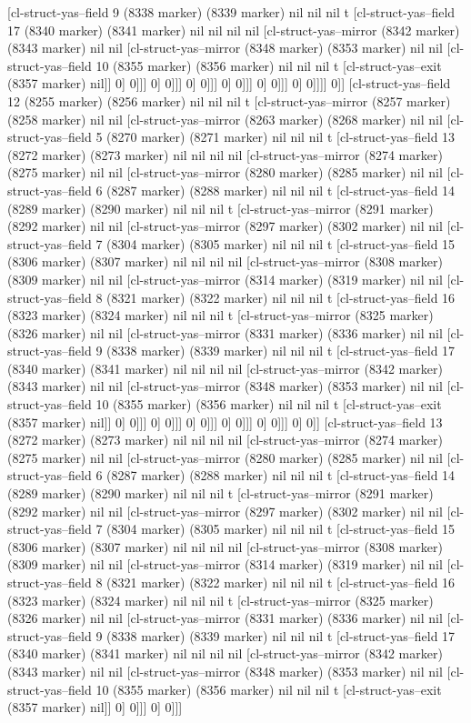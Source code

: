 {{[cl-struct-yas--field 9 (8338 marker) (8339 marker) nil nil nil t [cl-struct-yas--field 17 (8340 marker) (8341 marker) nil nil nil nil [cl-struct-yas--mirror (8342 marker) (8343 marker) nil nil [cl-struct-yas--mirror (8348 marker) (8353 marker) nil nil [cl-struct-yas--field 10 (8355 marker) (8356 marker) nil nil nil t [cl-struct-yas--exit (8357 marker) nil]] 0] 0]]] 0] 0]]] 0] 0]]] 0] 0]]] 0] 0]]] 0] 0]]]] 0]] [cl-struct-yas--field 12 (8255 marker) (8256 marker) nil nil nil t [cl-struct-yas--mirror (8257 marker) (8258 marker) nil nil [cl-struct-yas--mirror (8263 marker) (8268 marker) nil nil [cl-struct-yas--field 5 (8270 marker) (8271 marker) nil nil nil t [cl-struct-yas--field 13 (8272 marker) (8273 marker) nil nil nil nil [cl-struct-yas--mirror (8274 marker) (8275 marker) nil nil [cl-struct-yas--mirror (8280 marker) (8285 marker) nil nil [cl-struct-yas--field 6 (8287 marker) (8288 marker) nil nil nil t [cl-struct-yas--field 14 (8289 marker) (8290 marker) nil nil nil t [cl-struct-yas--mirror (8291 marker) (8292 marker) nil nil [cl-struct-yas--mirror (8297 marker) (8302 marker) nil nil [cl-struct-yas--field 7 (8304 marker) (8305 marker) nil nil nil t [cl-struct-yas--field 15 (8306 marker) (8307 marker) nil nil nil nil [cl-struct-yas--mirror (8308 marker) (8309 marker) nil nil [cl-struct-yas--mirror (8314 marker) (8319 marker) nil nil [cl-struct-yas--field 8 (8321 marker) (8322 marker) nil nil nil t [cl-struct-yas--field 16 (8323 marker) (8324 marker) nil nil nil t [cl-struct-yas--mirror (8325 marker) (8326 marker) nil nil [cl-struct-yas--mirror (8331 marker) (8336 marker) nil nil [cl-struct-yas--field 9 (8338 marker) (8339 marker) nil nil nil t [cl-struct-yas--field 17 (8340 marker) (8341 marker) nil nil nil nil [cl-struct-yas--mirror (8342 marker) (8343 marker) nil nil [cl-struct-yas--mirror (8348 marker) (8353 marker) nil nil [cl-struct-yas--field 10 (8355 marker) (8356 marker) nil nil nil t [cl-struct-yas--exit (8357 marker) nil]] 0] 0]]] 0] 0]]] 0] 0]]] 0] 0]]] 0] 0]]] 0] 0]] [cl-struct-yas--field 13 (8272 marker) (8273 marker) nil nil nil nil [cl-struct-yas--mirror (8274 marker) (8275 marker) nil nil [cl-struct-yas--mirror (8280 marker) (8285 marker) nil nil [cl-struct-yas--field 6 (8287 marker) (8288 marker) nil nil nil t [cl-struct-yas--field 14 (8289 marker) (8290 marker) nil nil nil t [cl-struct-yas--mirror (8291 marker) (8292 marker) nil nil [cl-struct-yas--mirror (8297 marker) (8302 marker) nil nil [cl-struct-yas--field 7 (8304 marker) (8305 marker) nil nil nil t [cl-struct-yas--field 15 (8306 marker) (8307 marker) nil nil nil nil [cl-struct-yas--mirror (8308 marker) (8309 marker) nil nil [cl-struct-yas--mirror (8314 marker) (8319 marker) nil nil [cl-struct-yas--field 8 (8321 marker) (8322 marker) nil nil nil t [cl-struct-yas--field 16 (8323 marker) (8324 marker) nil nil nil t [cl-struct-yas--mirror (8325 marker) (8326 marker) nil nil [cl-struct-yas--mirror (8331 marker) (8336 marker) nil nil [cl-struct-yas--field 9 (8338 marker) (8339 marker) nil nil nil t [cl-struct-yas--field 17 (8340 marker) (8341 marker) nil nil nil nil [cl-struct-yas--mirror (8342 marker) (8343 marker) nil nil [cl-struct-yas--mirror (8348 marker) (8353 marker) nil nil [cl-struct-yas--field 10 (8355 marker) (8356 marker) nil nil nil t [cl-struct-yas--exit (8357 marker) nil]] 0] 0]]] 0] 0]]] }}
